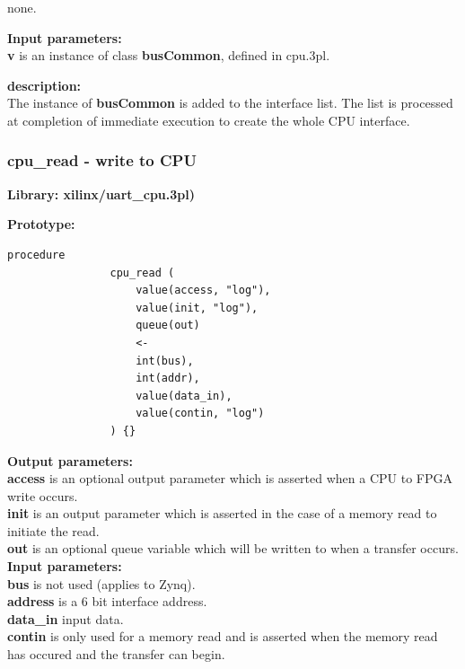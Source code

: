                 none.
                       
            {\bf Input parameters:} \\
            {\bf v} is an instance of class {\bf busCommon}, defined in
            cpu.3pl.
                     
            {\bf description:} \\
            The instance of {\bf busCommon} is added to the interface list.
            The list is processed at completion of immediate execution to
            create the whole CPU interface.


        \subsubsection{cpu\_read - write to CPU}\label{sec:lpuartcpurd}

            {\bf Library: xilinx/uart\_cpu.3pl)}

            {\bf Prototype:} \\
            \vsp
            \begin{lstlisting}[gobble=12, language=threepl]
                procedure
                cpu_read (
                    value(access, "log"),
                    value(init, "log"), 
                    queue(out)
                    <-
                    int(bus),
                    int(addr),
                    value(data_in),
                    value(contin, "log")
                ) {}
            \end{lstlisting}
            
            {\bf Output parameters:} \\
            {\bf access} is an optional output parameter which is asserted
            when a CPU to FPGA write occurs.\\
            {\bf init} is an output parameter which is asserted in the case
            of a memory read to initiate the read.\\
            {\bf out} is an optional queue variable which will be written to
            when a transfer occurs.\\

                       
            {\bf Input parameters:} \\
            {\bf bus} is not used (applies to Zynq).\\
            {\bf address} is a 6 bit interface address.\\
            {\bf data\_in} input data.\\
            {\bf contin} is only used for a memory read and is asserted
            when the memory read has occured and the transfer can begin.\\
                     
